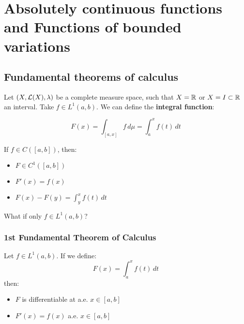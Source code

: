 \chapter{Absolutely continuous functions and Functions of bounded variations}

\section{Fundamental theorems of calculus}

Let $(X, \mathcal{L}(X), \lambda)$ be a complete measure space, such that 
$X = \mathbb{R}$ or $X = I \subset \mathbb{R}$ an interval.
Take $f \in L^1(a, b)$. We can define the \textbf{integral function}:

$$F(x) = \int_[a, x] f \, d\mu = \int_a^x f(t) \, dt$$

If $f \in C([a, b])$, then:

\begin{itemize}
    \item $F \in C^1([a, b])$
    \item $F'(x) = f(x)$
    \item $F(x) - F(y) = \int_y^x f(t) \, dt$
\end{itemize}

What if only $f \in L^1(a, b)$? 

\subsection{1st Fundamental Theorem of Calculus}

\begin{ftheorem}
    Let $f \in L^1(a, b)$. If we define:
    $$F(x) = \int_a^x f(t) \, dt$$
    then:
    \vspace{1em}
    \begin{itemize}
        \item $F$ is differentiable at a.e. $x \in [a, b]$
        \vspace{1em}
        \item $F'(x) = f(x)$ a.e. $x \in [a, b]$
    \end{itemize}
\end{ftheorem}


